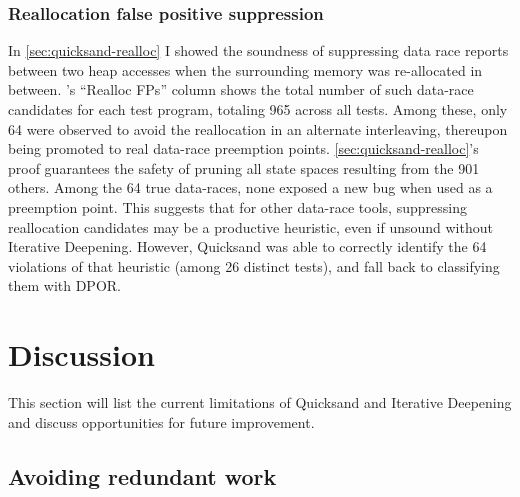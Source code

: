 \subsubsection{Reallocation false positive suppression}

In \cref{sec:quicksand-realloc} I showed the soundness of
suppressing data race reports between two heap accesses when the surrounding memory was re-allocated in between.
's ``Realloc FPs'' column shows the total number of such data-race candidates for each test program,
totaling 965 across all tests.
Among these, only 64 were observed to avoid the reallocation in an alternate interleaving,
thereupon being promoted to real data-race preemption points.
\cref{sec:quicksand-realloc}'s proof guarantees the safety of pruning all state spaces resulting from the 901 others.
%
Among the 64 true data-races, %
none exposed a new bug when used as a preemption point.
This suggests that for other data-race tools,
suppressing reallocation candidates may be a productive heuristic,
even if unsound without Iterative Deepening.
However, Quicksand was able to correctly identify the 64 violations of that heuristic (among 26 distinct tests),
and fall back to classifying them with DPOR.


\section{Discussion}
\label{sec:quicksand-discussion}

This section will list the current limitations of Quicksand and Iterative Deepening
and discuss opportunities for future improvement.

\subsection{Avoiding redundant work}

